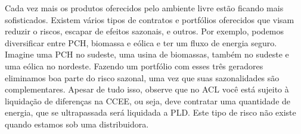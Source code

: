 Cada vez mais os produtos oferecidos pelo ambiente livre estão ficando mais sofisticados. Existem vários tipos de contratos e portfólios oferecidos que visam reduzir o riscos, escapar de efeitos sazonais, e outros. Por exemplo, podemos diversificar entre PCH, biomassa e eólica e ter um fluxo de energia seguro. Imagine uma PCH no sudeste, uma usina de biomassas, também no sudeste e uma eólica no nordeste. Fazendo um portfólio com esses três geradores eliminamos boa parte do risco sazonal, uma vez que suas sazonalidades são complementares. Apesar de tudo isso, observe que no ACL você está sujeito à liquidação de diferenças na CCEE, ou seja, deve contratar uma quantidade de energia, que se ultrapassada será liquidada a PLD. Este tipo de risco não existe quando estamos sob uma distribuidora.  
